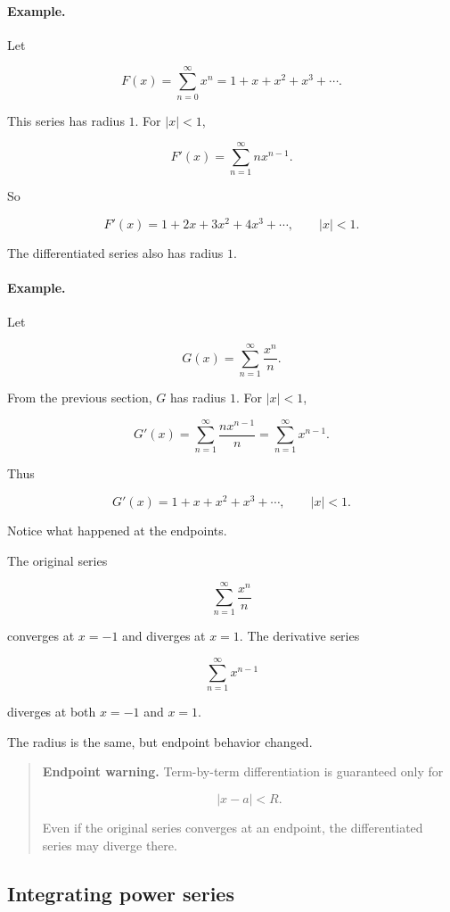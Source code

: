 \paragraph{Example.}
Let

\[
F(x)=\sum_{n=0}^{\infty} x^n
=
1+x+x^2+x^3+\cdots.
\]

This series has radius \(1\).  For \(|x|<1\),

\[
F'(x)
=
\sum_{n=1}^{\infty} n x^{n-1}.
\]

So

\[
F'(x)=1+2x+3x^2+4x^3+\cdots,
\qquad |x|<1.
\]

The differentiated series also has radius \(1\).

\paragraph{Example.}
Let

\[
G(x)=\sum_{n=1}^{\infty}\frac{x^n}{n}.
\]

From the previous section, \(G\) has radius \(1\).  For \(|x|<1\),

\[
G'(x)
=
\sum_{n=1}^{\infty}\frac{n x^{n-1}}{n}
=
\sum_{n=1}^{\infty}x^{n-1}.
\]

Thus

\[
\boxed{
G'(x)=1+x+x^2+x^3+\cdots,
\qquad |x|<1.
}
\]

Notice what happened at the endpoints.

The original series

\[
\sum_{n=1}^{\infty}\frac{x^n}{n}
\]

converges at \(x=-1\) and diverges at \(x=1\).  The derivative series

\[
\sum_{n=1}^{\infty}x^{n-1}
\]

diverges at both \(x=-1\) and \(x=1\).

The radius is the same, but endpoint behavior changed.

\begin{quote}
\textbf{Endpoint warning.}
Term-by-term differentiation is guaranteed only for

\[
|x-a|<R.
\]

Even if the original series converges at an endpoint, the differentiated series may
diverge there.
\end{quote}

\subsection{Integrating power series}
\label{subsec:integrating-power-series}

